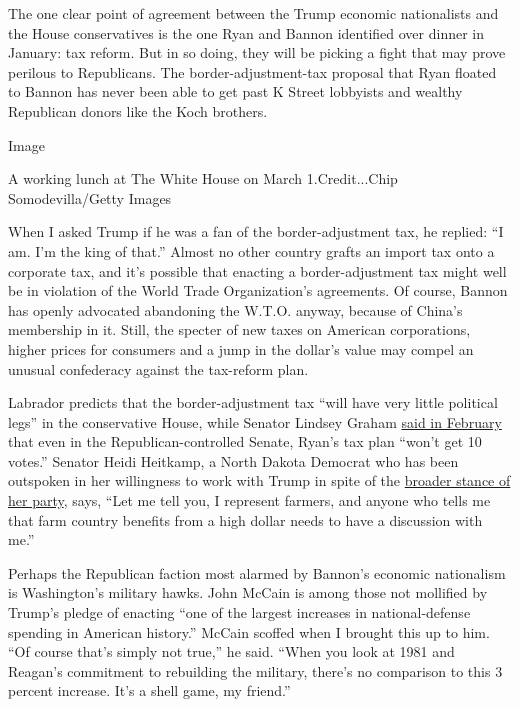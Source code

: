 The one clear point of agreement between the Trump economic nationalists
and the House conservatives is the one Ryan and Bannon identified over
dinner in January: tax reform. But in so doing, they will be picking a
fight that may prove perilous to Republicans. The border-adjustment-tax
proposal that Ryan floated to Bannon has never been able to get past K
Street lobbyists and wealthy Republican donors like the Koch brothers.

Image

A working lunch at The White House on March 1.Credit...Chip
Somodevilla/Getty Images

When I asked Trump if he was a fan of the border-adjustment tax, he
replied: ``I am. I'm the king of that.'' Almost no other country grafts
an import tax onto a corporate tax, and it's possible that enacting a
border-adjustment tax might well be in violation of the World Trade
Organization's agreements. Of course, Bannon has openly advocated
abandoning the W.T.O. anyway, because of China's membership in it.
Still, the specter of new taxes on American corporations, higher prices
for consumers and a jump in the dollar's value may compel an unusual
confederacy against the tax-reform plan.

Labrador predicts that the border-adjustment tax ``will have very little
political legs'' in the conservative House, while Senator Lindsey Graham
\href{http://thehill.com/homenews/senate/320306-graham-ryan-tax-plan-wont-get-10-votes-in-the-senate}{said
in February} that even in the Republican-controlled Senate, Ryan's tax
plan ``won't get 10 votes.'' Senator Heidi Heitkamp, a North Dakota
Democrat who has been outspoken in her willingness to work with Trump in
spite of the
\href{https://www.nytimes3xbfgragh.onion/2017/03/13/magazine/democratic-party-election-trump.html}{broader
stance of her party}, says, ``Let me tell you, I represent farmers, and
anyone who tells me that farm country benefits from a high dollar needs
to have a discussion with me.''

Perhaps the Republican faction most alarmed by Bannon's economic
nationalism is Washington's military hawks. John McCain is among those
not mollified by Trump's pledge of enacting ``one of the largest
increases in national-defense spending in American history.'' McCain
scoffed when I brought this up to him. ``Of course that's simply not
true,'' he said. ``When you look at 1981 and Reagan's commitment to
rebuilding the military, there's no comparison to this 3 percent
increase. It's a shell game, my friend.''

